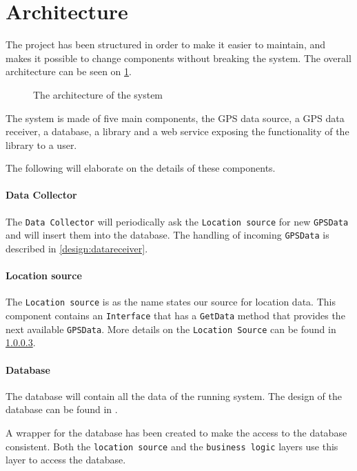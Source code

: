 \section{Architecture}

The project has been structured in order to make it easier to maintain, and makes it possible to change components without breaking the system.
The overall architecture can be seen on \cref{arch}.

\begin{figure}[h]
\center

\caption{The architecture of the system}
\label{arch}
\end{figure}

The system is made of five main components, the GPS data source, a GPS data receiver, a database, a library and a web service exposing the functionality of the library to a user.

The following will elaborate on the details of these components.

\paragraph{Data Collector}
The \texttt{Data Collector} will periodically ask the \texttt{Location source} for new \texttt{GPSData} and will insert them into the database. 
The handling of incoming \texttt{GPSData} is described in \cref{design:datareceiver}.

\paragraph{Location source}
The \texttt{Location source} is as the name states our source for location data.
This component contains an \texttt{Interface} that has a \texttt{GetData} method that provides the next available \texttt{GPSData}.
More details on the \texttt{Location Source} can be found in \cref{}. 


\paragraph{Database}
The database will contain all the data of the running system.
The design of the database can be found in .

A wrapper for the database has been created to make the access to the database consistent. 
Both the \texttt{location source} and the \texttt{business logic} layers use this layer to access the database.

